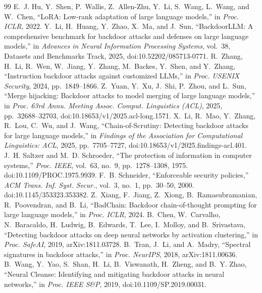 \documentclass[journal]{IEEEtran}
\begin{document}
\raggedbottom
\begin{thebibliography}{99}
 E.~J. Hu, Y.~Shen, P.~Wallis, Z.~Allen-Zhu, Y.~Li, S.~Wang, L.~Wang, and W.~Chen, ``LoRA: Low-rank adaptation of large language models,'' in \emph{Proc. ICLR}, 2022.
 Y.~Li, H.~Huang, Y.~Zhao, X.~Ma, and J.~Sun, ``BackdoorLLM: A comprehensive benchmark for backdoor attacks and defenses on large language models,'' in \emph{Advances in Neural Information Processing Systems}, vol.~38, Datasets and Benchmarks Track, 2025, doi:10.52202/085713-0771.
 R.~Zhang, H.~Li, R.~Wen, W.~Jiang, Y.~Zhang, M.~Backes, Y.~Shen, and Y.~Zhang, ``Instruction backdoor attacks against customized LLMs,'' in \emph{Proc. USENIX Security}, 2024, pp.~1849--1866.
 Z.~Yuan, Y.~Xu, J.~Shi, P.~Zhou, and L.~Sun, ``Merge hijacking: Backdoor attacks to model merging of large language models,'' in \emph{Proc. 63rd Annu. Meeting Assoc. Comput. Linguistics (ACL)}, 2025, pp.~32688--32703, doi:10.18653/v1/2025.acl-long.1571.
 X.~Li, R.~Mao, Y.~Zhang, R.~Lou, C.~Wu, and J.~Wang, ``Chain-of-Scrutiny: Detecting backdoor attacks for large language models,'' in \emph{Findings of the Association for Computational Linguistics: ACL}, 2025, pp.~7705--7727, doi:10.18653/v1/2025.findings-acl.401.
 J.~H. Saltzer and M.~D. Schroeder, ``The protection of information in computer systems,'' \emph{Proc. IEEE}, vol.~63, no.~9, pp.~1278--1308, 1975. doi:10.1109/PROC.1975.9939.
 F.~B. Schneider, ``Enforceable security policies,'' \emph{ACM Trans. Inf. Syst. Secur.}, vol.~3, no.~1, pp.~30--50, 2000. doi:10.1145/353323.353382.
 Z.~Xiang, F.~Jiang, Z.~Xiong, B.~Ramasubramanian, R.~Poovendran, and B.~Li, ``BadChain: Backdoor chain-of-thought prompting for large language models,'' in \emph{Proc. ICLR}, 2024.
 B.~Chen, W.~Carvalho, N.~Baracaldo, H.~Ludwig, B.~Edwards, T.~Lee, I.~Molloy, and B.~Srivastava, ``Detecting backdoor attacks on deep neural networks by activation clustering,'' in \emph{Proc. SafeAI}, 2019, arXiv:1811.03728.
 B.~Tran, J.~Li, and A.~Madry, ``Spectral signatures in backdoor attacks,'' in \emph{Proc. NeurIPS}, 2018, arXiv:1811.00636.
 B.~Wang, Y.~Yao, S.~Shan, H.~Li, B.~Viswanath, H.~Zheng, and B.~Y. Zhao, ``Neural Cleanse: Identifying and mitigating backdoor attacks in neural networks,'' in \emph{Proc. IEEE S\&P}, 2019, doi:10.1109/SP.2019.00031.

\end{thebibliography}
\end{document}
